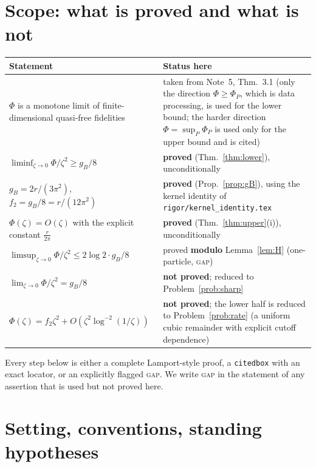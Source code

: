 \documentclass[11pt]{article}
\theoremstyle{definition}\newtheorem{problem}[theorem]{Problem}
\begin{document}
\tableofcontents

\section{Scope: what is proved and what is not}\label{sec:scope}

\begin{center}\small
\begin{tabular}{p{}p{}}\toprule
\textbf{Statement} & \textbf{Status here}\\\midrule
\(\Phi\) is a monotone limit of finite-dimensional quasi-free fidelities & taken from Note~5,
Thm.~3.1 (only the direction \(\Phi\ge\Phi_P\), which is data processing, is used for the lower
bound; the harder direction \(\Phi=\sup_P\Phi_P\) is used only for the upper bound and is cited)\\
\(\liminf_{\zeta\to0}\Phi/\zeta^2\ge g_B/8\) & \textbf{proved} (Thm.~\ref{thm:lower}), unconditionally\\
\(g_B=2r/(3\pi^2)\), \(f_2=g_B/8=r/(12\pi^2)\) & \textbf{proved} (Prop.~\ref{prop:gB}), using the
kernel identity of \texttt{rigor/kernel\_identity.tex}\\
\(\Phi(\zeta)=O(\zeta)\) with the explicit constant \(\frac r{2\pi}\) & \textbf{proved}
(Thm.~\ref{thm:upper}(i)), unconditionally\\
\(\limsup_{\zeta\to0}\Phi/\zeta^2\le 2\log2\cdot g_B/8\) & proved \textbf{modulo}
Lemma~\ref{lem:H} (one-particle, \textsc{gap})\\
\(\lim_{\zeta\to0}\Phi/\zeta^2=g_B/8\) & \textbf{not proved}; reduced to Problem~\ref{prob:sharp}\\
\(\Phi(\zeta)=f_2\zeta^2+O(\zeta^2\log^{-2}(1/\zeta))\) & \textbf{not proved}; the lower half is
reduced to Problem~\ref{prob:rate} (a uniform cubic remainder with explicit cutoff dependence)\\
\bottomrule\end{tabular}
\end{center}

Every step below is either a complete Lamport-style proof, a \texttt{citedbox} with an exact
locator, or an explicitly flagged \textsc{gap}.  We write \textsc{gap} in the statement of any
assertion that is used but not proved here.

\section{Setting, conventions, standing hypotheses}\label{sec:setting}
\end{document}
